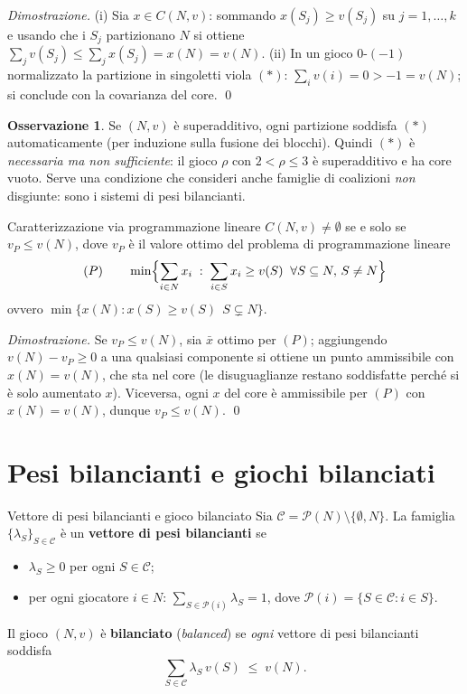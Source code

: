 \documentclass[12pt,a4paper,twoside]{book}
\theoremstyle{plain}
\theoremstyle{definition}
\newtheorem{remark}[theorem]{Osservazione}
\begin{document}
\textit{Dimostrazione.} (i) Sia $x\in C(N,v)$: sommando $x(S_j)\ge v(S_j)$ su
$j=1,\dots,k$ e usando che i $S_j$ partizionano $N$ si ottiene
$\sum_j v(S_j)\le \sum_j x(S_j)=x(N)=v(N)$. (ii) In un gioco $0$-$(-1)$
normalizzato la partizione in singoletti viola $(*)$: $\sum_i v(i)=0>-1=v(N)$;
si conclude con la covarianza del core. \qed

\begin{remark}
Se $(N,v)$ è superadditivo, ogni partizione soddisfa $(*)$ automaticamente
(per induzione sulla fusione dei blocchi). Quindi $(*)$ è \emph{necessaria ma non
sufficiente}: il gioco $\rho$ con $2<\rho\le 3$ è superadditivo e ha core vuoto.
Serve una condizione che consideri anche famiglie di coalizioni \emph{non}
disgiunte: sono i sistemi di pesi bilancianti.
\end{remark}

\begin{thmbox}{Caratterizzazione via programmazione lineare}
$C(N,v)\ne\emptyset$ se e solo se $v_P\le v(N)$, dove $v_P$ è il valore ottimo del
problema di programmazione lineare
\[
  (P)\qquad \min\Bigl\{\sum_{i\in N}x_i\;:\;\sum_{i\in S}x_i\ge v(S)\;\;\forall S\subseteq N,\,S\ne N\Bigr\}
\]
ovvero $\min\{x(N):x(S)\ge v(S)\ \ S\subsetneq N\}$.
\end{thmbox}

\textit{Dimostrazione.} Se $v_P\le v(N)$, sia $\bar x$ ottimo per $(P)$; aggiungendo
$v(N)-v_P\ge 0$ a una qualsiasi componente si ottiene un punto ammissibile con
$x(N)=v(N)$, che sta nel core (le disuguaglianze restano soddisfatte perché si
è solo aumentato $x$). Viceversa, ogni $x$ del core è ammissibile per $(P)$ con
$x(N)=v(N)$, dunque $v_P\le v(N)$. \qed

\section{Pesi bilancianti e giochi bilanciati}

\begin{defbox}{Vettore di pesi bilancianti e gioco bilanciato}
Sia $\mathcal{C}=\mathcal{P}(N)\setminus\{\emptyset,N\}$. La famiglia
$\{\lambda_S\}_{S\in\mathcal{C}}$ è un \textbf{vettore di pesi bilancianti} se
\begin{itemize}
  \item $\lambda_S\ge 0$ per ogni $S\in\mathcal{C}$;
  \item per ogni giocatore $i\in N$: $\displaystyle\sum_{S\in\mathcal{P}(i)}\lambda_S=1$, dove
        $\mathcal{P}(i)=\{S\in\mathcal{C}: i\in S\}$.
\end{itemize}
Il gioco $(N,v)$ è \textbf{bilanciato} (\emph{balanced}) se \emph{ogni} vettore di
pesi bilancianti soddisfa
\[
  \sum_{S\in\mathcal{C}}\lambda_S\,v(S)\;\le\;v(N).
\]
\end{defbox}
\end{document}
